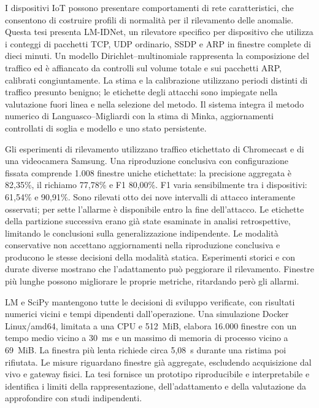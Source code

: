 I dispositivi IoT possono presentare comportamenti di rete caratteristici,
che consentono di costruire profili di normalità per il rilevamento delle
anomalie. Questa tesi presenta LM-IDNet, un rilevatore specifico per
dispositivo che utilizza i conteggi di pacchetti TCP, UDP ordinario, SSDP
e ARP in finestre complete di dieci minuti. Un modello
Dirichlet--multinomiale rappresenta la composizione del traffico ed è
affiancato da controlli sul volume totale e sui pacchetti ARP, calibrati
congiuntamente. La stima e la calibrazione utilizzano periodi distinti
di traffico presunto benigno; le etichette degli attacchi sono impiegate
nella valutazione fuori linea e nella selezione del metodo. Il sistema
integra il metodo numerico di Languasco--Migliardi con la stima di Minka,
aggiornamenti controllati di soglia e modello e uno stato persistente.

Gli esperimenti di rilevamento utilizzano traffico etichettato di
Chromecast e di una videocamera Samsung. Una riproduzione conclusiva
con configurazione fissata comprende 1.008 finestre uniche etichettate:
la precisione aggregata è 82,35\%, il richiamo 77,78\% e F1 80,00\%.
F1 varia sensibilmente tra i dispositivi: 61,54\% e 90,91\%. Sono
rilevati otto dei nove intervalli di attacco interamente osservati;
per sette l'allarme è disponibile entro la fine dell'attacco. Le
etichette della partizione successiva erano già state esaminate in
analisi retrospettive, limitando le conclusioni sulla generalizzazione
indipendente. Le modalità conservative non accettano aggiornamenti
nella riproduzione conclusiva e producono le stesse decisioni della
modalità statica. Esperimenti storici e con durate diverse mostrano
che l'adattamento può peggiorare il rilevamento. Finestre più lunghe
possono migliorare le proprie metriche, ritardando però gli allarmi.

LM e SciPy mantengono tutte le decisioni di sviluppo verificate, con
risultati numerici vicini e tempi dipendenti dall'operazione. Una
simulazione Docker Linux/amd64, limitata a una CPU e 512~MiB, elabora
16.000 finestre con un tempo medio vicino a 30~ms e un massimo di
memoria di processo vicino a 69~MiB. La finestra più lenta richiede
circa 5,08~s durante una ristima poi rifiutata. Le misure riguardano
finestre già aggregate, escludendo acquisizione dal vivo e gateway
fisici. La tesi fornisce un prototipo riproducibile e interpretabile
e identifica i limiti della rappresentazione, dell'adattamento e
della valutazione da approfondire con studi indipendenti.

